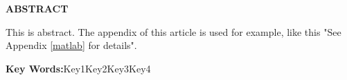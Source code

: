 \vspace*{-21.6pt}
\begin{center}
\Large
{}
\end{center}
\par
{}
{}
\begin{center}
    \fontsize{14pt}{17pt}\selectfont\rmfamily\bfseries
ABSTRACT
\end{center}

\par
This is abstract. The appendix of this article is used for example, like this "See Appendix \ref{matlab} for details".

\bigskip
\noindent\textbf{Key Words:}\quad Key1\quad Key2\quad Key3\quad Key4

